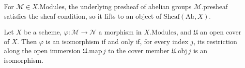 \begin{lemma}
  \label{mk-lem:modules_isSheaf_mathlib}
  \mathlibok

  For \(\mathcal{M} \in X.\mathrm{Modules}\), the underlying presheaf of abelian groups
  \(\mathcal{M}.\mathrm{presheaf}\) satisfies the sheaf condition, so it lifts to an object of
  \(\mathrm{Sheaf}(\mathrm{Ab}, X)\).
\end{lemma}

\begin{lemma}\label{mk-lem:isIso_iff_isIso_restrict}
  \leanok

  Let \(X\) be a scheme, \(\varphi : \mathcal{M} \to \mathcal{N}\) a morphism in
  \(X.\mathrm{Modules}\), and \(\mathfrak{U}\) an open cover of \(X\). Then \(\varphi\) is an
  isomorphism if and only if, for every index \(j\), its restriction along the open immersion
  \(\mathfrak{U}.\mathrm{map}\,j\) to the cover member \(\mathfrak{U}.\mathrm{obj}\,j\) is
  an isomorphism.
\end{lemma}

